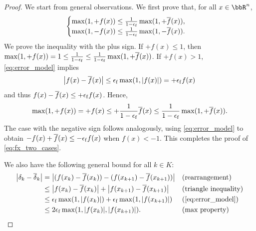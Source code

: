 \documentclass[journal_revised_MPC]{subfiles}
\begin{document}
\begin{proof}
    We start from general observations.
    We first prove that, for all $x \in \bbR^n$,
    \begin{equation}\label{eq:fx_two_cases}
        \begin{cases}
            \max(1,+f(x))  \le \frac{1}{1-\epsilon_\mathrm{f}} \max(1,+\overline f(x)), \\
            \max(1,-f(x)) \le \frac{1}{1-\epsilon_\mathrm{f}} \max(1,-\overline f(x)).
        \end{cases}
    \end{equation}
    We prove the inequality with the plus sign.
    If $+f(x)\le 1$, then $\max(1,+f(x)) = 1 \leq \frac{1}{1-\epsilon_\mathrm{f}} \leq \frac{1}{1-\epsilon_\mathrm{f}} \max(1,+\overline f(x))$.
    If $+f(x) > 1$, \cref{eq:error_model} implies
    \begin{equation*}
        \abs{f(x)-\overline{f}(x)} \le \epsilon_\mathrm{f} \max(1,\abs{f(x)}) = +\epsilon_\mathrm{f} f(x)
    \end{equation*}
    and thus $f(x) - \overline f(x) \leq +\epsilon_\mathrm{f} f(x)$. Hence,
    \begin{equation*}
        \max(1,+f(x)) = +f(x) \le +\frac{1}{1-\epsilon_\mathrm{f}} \overline f(x) \le \frac{1}{1-\epsilon_\mathrm{f}} \max(1,+\overline f(x)).
    \end{equation*}
    The case with the negative sign follows analogously, using \cref{eq:error_model} to obtain $-f(x) + \overline f(x) \leq -\epsilon_\mathrm{f} f(x)$ when $f(x)<-1$.
    This completes the proof of \cref{eq:fx_two_cases}.

    We also have the following general bound for all $k \in K$:
    \begin{align}
        \abs{\delta_k-\overline{\delta}_k}
         & = \abs{(f(x_k)-\overline{f}(x_k)) - (f(x_{k+1})-\overline{f}(x_{k+1}))}      &  & (\text{rearrangement})                                \notag \\
         & \leq \abs{f(x_k)-\overline{f}(x_k)} + \abs{f(x_{k+1})-\overline{f}(x_{k+1})} &  & (\text{triangle inequality}) \notag                          \\
         & \le \feps\max(1,\abs{f(x_k)}) + \feps\max(1,\abs{f(x_{k+1})})                &  & (\text{\cref{eq:error_model}}) \notag                        \\
         & \le 2\feps \max(1,\abs{f(x_k)},\abs{f(x_{k+1})}).                            &  & (\text{max property}) \label{eq:delta_k_error_bound}
    \end{align}


\end{proof}
\end{document}
